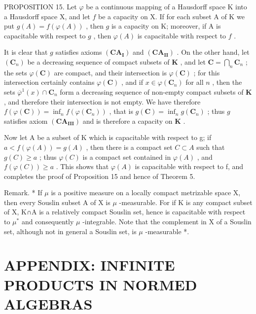 PROPOSITION 15. Let \(\varphi\) be a continuous mapping of a Hausdorff space K into a Hausdorff space X, and let \(f\) be a capacity on X. If for each subset A of K we put \(g(A) = f(\varphi(A))\) , then \(g\) is a capacity on K; moreover, if A is capacitable with respect to \(g\) , then \(\varphi(A)\) is capacitable with respect to \(f\) .

It is clear that \(g\) satisfies axioms \((\mathbf{CA}_{\mathbf{I}})\) and \((\mathbf{CA}_{\mathbf{II}})\) . On the other hand, let \((\mathbf{C}_n)\) be a decreasing sequence of compact subsets of \(\mathbf{K}\) , and let \(\mathbf{C} = \bigcap_{n} \mathbf{C}_n\) ; the sets \(\varphi(\mathbf{C})\) are compact, and their intersection is \(\varphi(\mathbf{C})\) ; for this intersection certainly contains \(\varphi(\mathbf{C})\) , and if \(x \in \varphi(\mathbf{C}_n)\) for all \(n\) , then the sets \(\overline{\varphi}^1(x) \cap \mathbf{C}_n\) form a decreasing sequence of non-empty compact subsets of \(\mathbf{K}\) , and therefore their intersection is not empty. We have therefore \(f(\varphi(\mathbf{C})) = \inf_{n} f(\varphi(\mathbf{C}_n))\) , that is \(g(\mathbf{C}) = \inf_{n} g(\mathbf{C}_n)\) ; thus \(g\) satisfies axiom \((\mathbf{CA}_{\mathbf{III}})\) and is therefore a capacity on \(\mathbf{K}\) .

Now let A be a subset of K which is capacitable with respect to g; if \(a < f(\varphi(A)) = g(A)\) , then there is a compact set \(C \subset A\) such that \(g(C) \geqslant a\) ; thus \(\varphi(C)\) is a compact set contained in \(\varphi(A)\) , and \(f(\varphi(C)) \geqslant a\) . This shows that \(\varphi(A)\) is capacitable with respect to f, and completes the proof of Proposition 15 and hence of Theorem 5.

Remark. * If \(\mu\) is a positive measure on a locally compact metrizable space X, then every Souslin subset A of X is \(\mu\) -measurable. For if K is any compact subset of X, K∩A is a relatively compact Souslin set, hence is capacitable with respect to \(\mu^{*}\) and consequently \(\mu\) -integrable. Note that the complement in X of a Souslin set, although not in general a Souslin set, is \(\mu\) -measurable *.

\appendix
\setcounter{chapter}{9}
\renewcommand{\thechapter}{\Roman{chapter}}
\setcounter{subsection}{0}
\renewcommand{\thesubsection}{\arabic{subsection}}

\section*{APPENDIX: INFINITE PRODUCTS IN NORMED ALGEBRAS}
{}

